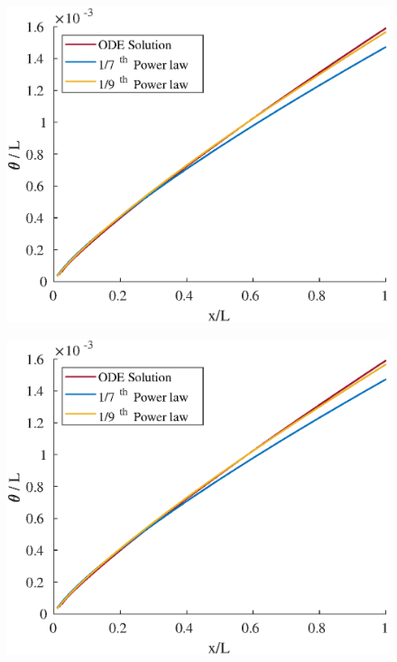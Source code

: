 \begin{figure}[H]
\centering
\includegraphics[scale=0.53]{graphs/e4g1.eps}
\caption{}
\label{e6g3}
\end{figure}

\begin{figure}[H]
\centering
\includegraphics[scale=0.53]{graphs/e4g1.eps}
\caption{}
\label{e6g4}
\end{figure}

